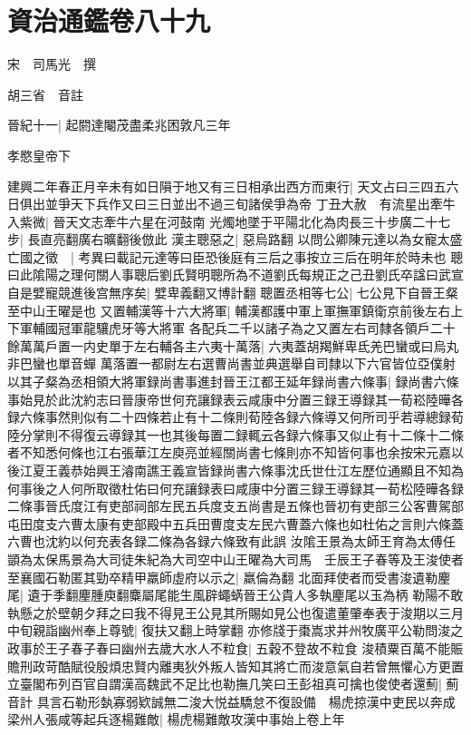 \chapter{資治通鑑卷八十九}
宋　司馬光　撰

胡三省　音註

晉紀十一|{
	起閼達閹茂盡柔兆困敦凡三年}


孝愍皇帝下

建興二年春正月辛未有如日隕于地又有三日相承出西方而東行|{
	天文占曰三四五六日俱出並爭天下兵作又曰三日並出不過三旬諸侯爭為帝}
丁丑大赦　有流星出牽牛入紫微|{
	晉天文志牽牛六星在河鼓南}
光燭地墜于平陽北化為肉長三十步廣二十七步|{
	長直亮翻廣右曠翻後倣此}
漢主聰惡之|{
	惡烏路翻}
以問公卿陳元達以為女寵太盛亡國之徵　|{
	考異曰載記元達等曰臣恐後庭有三后之事按立三后在明年於時未也}
聰曰此隂陽之理何關人事聰后劉氏賢明聰所為不道劉氏每規正之己丑劉氏卒諡曰武宣自是嬖寵競進後宫無序矣|{
	嬖卑義翻又博計翻}
聰置丞相等七公|{
	七公見下自晉王粲至中山王曜是也}
又置輔漢等十六大將軍|{
	輔漢都護中軍上軍撫軍鎮衛京前後左右上下軍輔國冠軍龍驤虎牙等大將軍}
各配兵二千以諸子為之又置左右司隸各領戶二十餘萬萬戶置一内史單于左右輔各主六夷十萬落|{
	六夷蓋胡羯鮮卑氐羌巴蠻或曰烏丸非巴蠻也單音蟬}
萬落置一都尉左右選曹尚書並典選舉自司隸以下六官皆位亞僕射以其子粲為丞相領大將軍録尚書事進封晉王江都王延年録尚書六條事|{
	録尚書六條事始見於此沈約志曰晉康帝世何充讓録表云咸康中分置三録王導録其一荀崧陸曄各録六條事然則似有二十四條若止有十二條則荀陸各録六條導又何所司乎若導總録荀陸分掌則不得復云導録其一也其後每置二録輒云各録六條事又似止有十二條十二條者不知悉何條也江右張華江左庾亮並經關尚書七條則亦不知皆何事也余按宋元嘉以後江夏王義恭始興王濬南譙王義宣皆録尚書六條事沈氏世仕江左歷位通顯且不知為何事後之人何所取徵杜佑曰何充讓録表曰咸康中分置三録王導録其一荀松陸曄各録二條事晉氏度江有吏部祠部左民五兵度支五尚書是五條也晉初有吏部三公客曹駕部屯田度支六曹太康有吏部殿中五兵田曹度支左民六曹蓋六條也如杜佑之言則六條蓋六曹也沈約以何充表各録二條為各録六條致有此誤}
汝隂王景為太師王育為太傅任顗為太保馬景為大司徒朱紀為大司空中山王曜為大司馬　壬辰王子春等及王浚使者至襄國石勒匿其勁卒精甲羸師虛府以示之|{
	羸倫為翻}
北面拜使者而受書浚遺勒麈尾|{
	遺于季翻麈腫庾翻麋屬尾能生風辟蠅蜹晉王公貴人多執麈尾以玉為柄}
勒陽不敢執懸之於壁朝夕拜之曰我不得見王公見其所賜如見公也復遣董肇奉表于浚期以三月中旬親詣幽州奉上尊號|{
	復扶又翻上時掌翻}
亦修牋于棗嵩求并州牧廣平公勒問浚之政事於王子春子春曰幽州去歲大水人不粒食|{
	五穀不登故不粒食}
浚積粟百萬不能賑贍刑政苛酷賦役殷煩忠賢内離夷狄外叛人皆知其將亡而浚意氣自若曾無懼心方更置立臺閣布列百官自謂漢高魏武不足比也勒撫几笑曰王彭祖真可擒也俊使者還薊|{
	薊音計}
具言石勒形埶寡弱欵誠無二浚大悦益驕怠不復設備　楊虎掠漢中吏民以奔成梁州人張咸等起兵逐楊難敵|{
	楊虎楊難敵攻漢中事始上卷上年}
